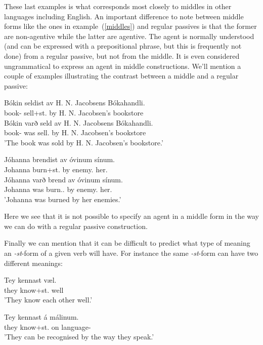\documentclass[12pt,%
]{lin-v2/lin}
\newcommand{\pref}[1]{(\ref{#1})}
\begin{document}
These last examples is what corresponds most closely to middles in other languages
including English. An important difference to note between middle forms like the ones
in example~\pref{middles} and regular passives is that the former are non-agentive while
the latter are agentive. The agent is normally understood (and can be expressed with
a prepositional phrase, but this is frequently not done) from a regular passive, but not from the middle.
It is even considered ungrammatical to express an agent in middle constructions. We'll
mention a couple of examples illustrating the contrast between a middle and a regular passive:
\begin{exe}
    \ex\label{middle_passive1}
    \begin{xlist}
        \ex \gll * Bókin seldist av H. N. Jacobsens Bókahandli.\\
        {} book-\Def{} sell+st.\Pst{} by H. N. Jacobsen's bookstore\\
        \ex \gll Bókin varð seld av H. N. Jacobsens Bókahandli.\\
        book-\Def{} was sell.\Pst{} by H. N. Jacobsen's bookstore\\ 
        \trans 'The book was sold by H. N. Jacobsen's bookstore.'\\
    \end{xlist}
    \ex\label{middle_passive2}
    \begin{xlist}
        \ex\label{johanna1} \gll * Jóhanna brendist av óvinum sínum.\\
        {} Johanna burn+st.\Pst{} by enemy.\Pl{} her.\Refl\\
        \ex \gll Jóhanna varð brend av óvinum sínum.\\
        Johanna was burn.\Pst.\Ptcp{} by enemy.\Pl{} her.\Refl\\ 
        \trans 'Johanna was burned by her enemies.'\\
    \end{xlist}
\end{exe}

Here we see that it is not possible to specify an agent in a middle form in the way we
can do with a regular passive construction.

Finally we can mention that it can be difficult to predict what type of meaning an
\emph{-st}-form of a given verb will have. For instance the same \emph{-st}-form can
have two different meanings:
\begin{exe}
    \ex\label{kennast}
    \begin{xlist}
        \item \gll Tey kennast væl.\\
        they know+st.\Prs{} well\\
        \trans 'They know each other well.'
        \item \gll Tey kennast á málinum.\\
        they know+st.\Prs{} on language-\Def\\
        \trans 'They can be recognised by the way they speak.'
    \end{xlist}
\end{exe}
\end{document}
